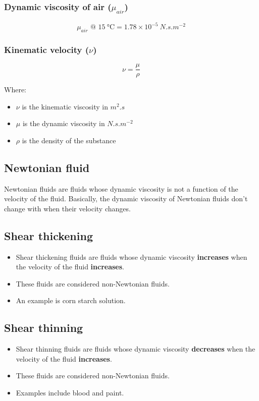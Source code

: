 \documentclass[11pt]{article}
\begin{document}
\subsubsection{Dynamic viscosity of air (\(\mu_{air}\))}
\label{sec:org4fc33c1}
\[\mu_{air} \text{ @ } \qty{15}{\degreeCelsius} = 1.78 \times 10^{-5} \ \unit{N.s.m^{-2}}\]

\subsubsection{Kinematic velocity (\(\nu\))}
\label{sec:org36c0d0d}
\[\nu = \frac{\mu}{\rho}\]

Where:
\begin{itemize}
\item \(\nu\) is the kinematic viscosity in \(\unit{m^2.s}\)
\item \(\mu\) is the dynamic viscosity in \(\unit{N.s.m^{-2}}\)
\item \(\rho\) is the density of the substance
\end{itemize}

\subsection{Newtonian fluid}
\label{sec:orgd7c987d}
Newtonian fluids are fluids whose dynamic viscosity is not a function of the velocity of the fluid. Basically, the dynamic viscosity of Newtonian fluids don't change with when their velocity changes.

\subsection{Shear thickening}
\label{sec:org29579da}
\begin{itemize}
\item Shear thickening fluids are fluids whose dynamic viscosity \textbf{increases} when the velocity of the fluid \textbf{increases}.
\item These fluids are considered non-Newtonian fluids.
\item An example is corn starch solution.
\end{itemize}

\subsection{Shear thinning}
\label{sec:orgc51a825}
\begin{itemize}
\item Shear thinning fluids are fluids whose dynamic viscosity \textbf{decreases} when the velocity of the fluid \textbf{increases}.
\item These fluids are considered non-Newtonian fluids.
\item Examples include blood and paint.
\end{itemize}
\end{document}
